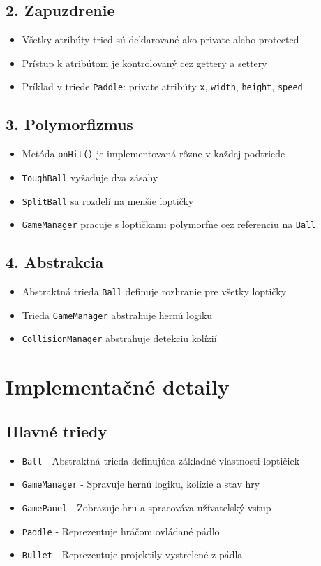 \documentclass[12pt,a4paper]{article}
\begin{document}
\subsection{2. Zapuzdrenie}
\begin{itemize}
    \item Všetky atribúty tried sú deklarované ako private alebo protected
    \item Prístup k atribútom je kontrolovaný cez gettery a settery
    \item Príklad v triede \texttt{Paddle}: private atribúty \texttt{x}, \texttt{width}, \texttt{height}, \texttt{speed}
\end{itemize}

\subsection{3. Polymorfizmus}
\begin{itemize}
    \item Metóda \texttt{onHit()} je implementovaná rôzne v každej podtriede
    \item \texttt{ToughBall} vyžaduje dva zásahy
    \item \texttt{SplitBall} sa rozdelí na menšie loptičky
    \item \texttt{GameManager} pracuje s loptičkami polymorfne cez referenciu na \texttt{Ball}
\end{itemize}

\subsection{4. Abstrakcia}
\begin{itemize}
    \item Abstraktná trieda \texttt{Ball} definuje rozhranie pre všetky loptičky
    \item Trieda \texttt{GameManager} abstrahuje hernú logiku
    \item \texttt{CollisionManager} abstrahuje detekciu kolízií
\end{itemize}

\section{Implementačné detaily}
\subsection{Hlavné triedy}
\begin{itemize}
    \item \texttt{Ball} - Abstraktná trieda definujúca základné vlastnosti loptičiek
    \item \texttt{GameManager} - Spravuje hernú logiku, kolízie a stav hry
    \item \texttt{GamePanel} - Zobrazuje hru a spracováva užívateľský vstup
    \item \texttt{Paddle} - Reprezentuje hráčom ovládané pádlo
    \item \texttt{Bullet} - Reprezentuje projektily vystrelené z pádla
\end{itemize}
\end{document}
